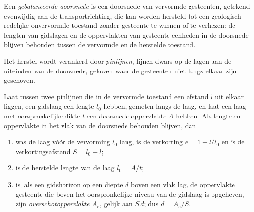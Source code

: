 \begin{definition}\label{def:b2:alpine-orogen:balanced}
Een \emph{gebalanceerde doorsnede} is een doorsnede van vervormde
gesteenten, getekend evenwijdig aan de transportrichting, die kan worden hersteld tot een geologisch
redelijke onvervormde toestand zonder gesteente te winnen of te verliezen: de lengten van gidslagen en
de oppervlakten van gesteente-eenheden in de doorsnede blijven behouden tussen de vervormde en de herstelde
toestand.
\end{definition}

Het herstel wordt verankerd door \emph{pinlijnen}, lijnen dwars op de lagen aan de uiteinden van de
doorsnede, gekozen waar de gesteenten niet langs elkaar zijn geschoven.

\begin{proposition}\label{prop:b2:alpine-orogen:balance}
Laat tussen twee pinlijnen die in de vervormde toestand een afstand $l$ uit elkaar liggen, een gidslaag een
lengte $l_0$ hebben, gemeten langs de laag, en laat een laag met oorspronkelijke dikte $t$ een
doorsnede-oppervlakte $A$ hebben. Als lengte en oppervlakte in het vlak van de doorsnede behouden blijven, dan
\begin{enumerate}
\item was de laag vóór de vervorming $l_0$ lang, is de verkorting
$e = 1 - l/l_0$ en is de verkortingsafstand $S = l_0 - l$;
\item is de herstelde lengte van de laag $l_0 = A/t$;
\item is, als een gidshorizon op een diepte $d$ boven een vlak  lag, de oppervlakte gesteente
die boven het oorspronkelijke niveau van de gidslaag is opgeheven, zijn \emph{overschotoppervlakte} $A_e$, gelijk aan $S\,d$;
dus $d = A_e/S$.
\end{enumerate}
\end{proposition}

